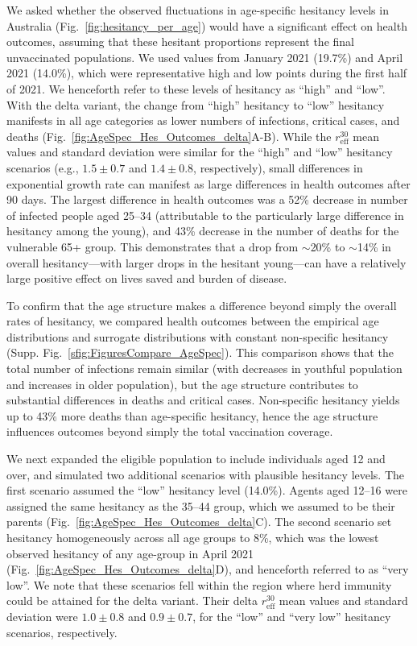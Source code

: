 \documentclass[article, a4, authoryear]{elsarticle}
\begin{document}
We asked whether the observed fluctuations in age-specific hesitancy levels in Australia (Fig.~\ref{fig:hesitancy_per_age}) would have a significant effect on health outcomes, assuming that these hesitant proportions represent the final unvaccinated populations. We used values from January 2021 (19.7\%) and April 2021 (14.0\%), which were representative high and low points during the first half of 2021. We henceforth refer to these levels of hesitancy as ``high'' and ``low''.   
With the delta variant, the change from ``high'' hesitancy to ``low'' hesitancy manifests in all age categories as lower numbers of infections, critical cases, and deaths (Fig.~\ref{fig:AgeSpec_Hes_Outcomes_delta}A-B). While the $r_\mathrm{eff}^{30}$ mean values and standard deviation were similar for the ``high'' and ``low'' hesitancy scenarios (e.g., $1.5\pm0.7$ and $1.4\pm0.8$, respectively), small differences in exponential growth rate can manifest as large differences in health outcomes after 90 days. The largest difference in health outcomes was a 52\% decrease in number of infected people aged 25--34 (attributable to the particularly large difference in hesitancy among the young), and 43\% decrease in the number of deaths for the vulnerable 65+ group. This demonstrates that a drop from $\sim$20\% to $\sim$14\% in overall hesitancy---with larger drops in the hesitant young---can have a relatively large positive effect on lives saved and burden of disease.
 

To confirm that the age structure makes a difference beyond simply the overall rates of hesitancy, we compared health outcomes between the empirical age distributions and surrogate distributions with constant non-specific hesitancy (Supp. Fig.~\ref{sfig:FiguresCompare_AgeSpec}). This comparison shows that the total number of infections remain similar (with decreases in youthful population and increases in older population), but the age structure contributes to substantial differences in deaths and critical cases. Non-specific hesitancy yields up to 43\% more deaths than age-specific hesitancy, hence the age structure influences outcomes beyond simply the total vaccination coverage.

We next expanded the eligible population to include individuals aged 12 and over, and simulated two additional scenarios with plausible hesitancy levels. The first scenario assumed the ``low'' hesitancy level (14.0\%). Agents aged 12--16 were assigned the same hesitancy as the 35--44 group, which we assumed to be their parents (Fig.~\ref{fig:AgeSpec_Hes_Outcomes_delta}C). The second scenario set hesitancy homogeneously across all age groups to 8\%, which was the lowest observed hesitancy of any age-group in April 2021 (Fig.~\ref{fig:AgeSpec_Hes_Outcomes_delta}D), and henceforth referred to as ``very low''.  We note that these scenarios fell within the region where herd immunity could be attained for the delta variant. Their delta $r_\mathrm{eff}^{30}$ mean values and standard deviation were $1.0\pm0.8$ and $0.9\pm0.7$, for the ``low'' and ``very low'' hesitancy scenarios, respectively.   
\end{document}
